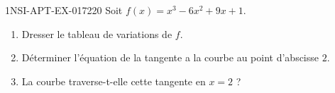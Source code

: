 \begin{exercice}{1NSI-APT-EX-017}{2}{20}
Soit $f(x) = x^3 - 6x^2 + 9x + 1$.
\begin{enumerate}
  \item Dresser le tableau de variations de $f$.
  \item Déterminer l'équation de la tangente a la courbe au point d'abscisse $2$.
  \item La courbe traverse-t-elle cette tangente en $x = 2$ ?
\end{enumerate}

\end{exercice}
